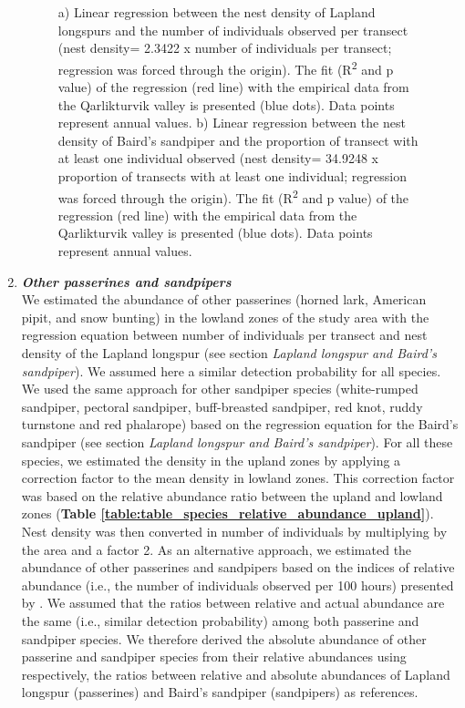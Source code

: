 \documentclass[a4paper,twoside,12pt]{article}
\begin{document}
\begin{enumerate}[label=\alph*.]
\begin{figure}[H]
\begin{subfigure}{0.5\textwidth}
                \caption{}
                \end{subfigure}
                \caption{a) Linear regression between the nest density of Lapland longspurs and the number of individuals observed per transect (nest density= 2.3422 x number of individuals per transect; regression was forced through the origin). The fit (R\textsuperscript{2} and p value) of the regression (red line) with the empirical data from the Qarlikturvik valley is presented (blue dots). Data points represent annual values. b) Linear regression between the nest density of Baird’s sandpiper and the proportion of transect with at least one individual observed (nest density= 34.9248 x proportion of transects with at least one individual; regression was forced through the origin). The fit (R\textsuperscript{2} and p value) of the regression (red line) with the empirical data from the Qarlikturvik valley is presented (blue dots). Data points represent annual values.}
                \label{figure:lalo_basa}
                \end{figure} 
                
                \item[] \textit{\textbf{Other passerines and sandpipers}}\\
                We estimated the abundance of other passerines (horned lark, American pipit, and snow bunting) in the lowland zones of the study area with the regression equation between number of individuals per transect and nest density of the Lapland longspur (see section \textit{Lapland longspur and Baird’s sandpiper}). We assumed here a similar detection probability for all species. We used the same approach for other sandpiper species (white-rumped sandpiper, pectoral sandpiper, buff-breasted sandpiper, red knot, ruddy turnstone and red phalarope) based on the regression equation for the Baird's sandpiper (see section \textit{Lapland longspur and Baird’s sandpiper}). For all these species, we estimated the density in the upland zones by applying a correction factor to the mean density in lowland zones. This correction factor was based on the relative abundance ratio between the upland and lowland zones (\textbf{Table \ref{table:table_species_relative_abundance_upland}}). Nest density was then converted in number of individuals by multiplying by the area and a factor 2.
As an alternative approach, we estimated the abundance of other passerines and sandpipers based on the indices of relative abundance (i.e., the number of individuals observed per 100 hours) presented by \citet{gauthier2024a}. We assumed that the ratios between relative and actual abundance are the same (i.e., similar detection probability) among both passerine and sandpiper species. We therefore derived the absolute abundance of other passerine and sandpiper species from their relative abundances using respectively, the ratios between relative and absolute abundances of Lapland longspur (passerines) and Baird’s sandpiper (sandpipers) as references.


\end{enumerate}
\end{document}
